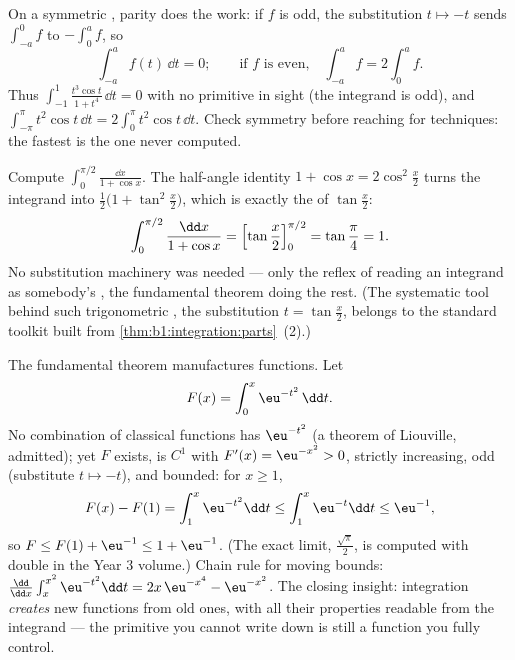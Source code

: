 \begin{example}\label{ex:b1:integration:parity}
On a symmetric , parity does the work: if $f$ is odd,
the substitution $t \mapsto -t$ sends $\int_{-a}^{0} f$ to
$-\int_0^a f$, so
\[
\int_{-a}^{a} f(t)\,\dd t = 0 ;
\qquad\text{if $f$ is even,}\quad
\int_{-a}^{a} f = 2\int_0^a f .
\]
Thus $\int_{-1}^{1} \frac{t^3\cos t}{1 + t^4}\,\dd t = 0$ with
no primitive in sight (the integrand is odd), and
$\int_{-\pi}^{\pi} t^2\cos t\,\dd t = 2\int_0^\pi t^2\cos t\,
\dd t$. Check symmetry before reaching for techniques: the
fastest  is the one never computed.
\end{example}

\begin{example}\label{ex:b1:integration:halfangle}
Compute $\displaystyle\int_0^{\pi/2} \frac{\dd x}{1 + \cos x}$.
The half-angle identity $1 + \cos x = 2\cos^2\frac x2$ turns the
integrand into $\frac{1}{2}\bigl(1 + \tan^2\frac
x2\bigr)$, which is exactly the  of $\tan\frac x2$:
\[
\int_0^{\pi/2} \frac{\dd x}{1 + \cos x}
= \Bigl[\tan\frac x2\Bigr]_0^{\pi/2} = \tan\frac\pi4 = 1 .
\]
No substitution machinery was needed --- only the reflex of
reading an integrand as somebody's , the fundamental
theorem doing the rest. (The systematic tool behind such
trigonometric , the substitution $t = \tan\frac x2$,
belongs to the standard toolkit built from
\cref{thm:b1:integration:parts}~(2).)
\end{example}

\begin{example}\label{ex:b1:integration:definedby}
The fundamental theorem manufactures functions. Let
\[
F(x) = \int_0^x \eu^{-t^2}\,\dd t .
\]
No combination of classical functions has 
$\eu^{-t^2}$ (a theorem of Liouville, admitted); yet $F$ exists,
is $C^1$ with $F'(x) = \eu^{-x^2} > 0$, strictly increasing, odd
(substitute $t \mapsto -t$), and bounded: for $x \geq 1$,
\[
F(x) - F(1) = \int_1^x \eu^{-t^2}\dd t
\leq \int_1^x \eu^{-t}\dd t \leq \eu^{-1} ,
\]
so $F \leq F(1) + \eu^{-1} \leq 1 + \eu^{-1}$. (The exact limit,
$\frac{\sqrt\pi}{2}$, is computed with double  in the
Year 3 volume.) Chain rule for moving bounds: $\frac{\dd}{\dd
x}\int_x^{x^2} \eu^{-t^2}\dd t = 2x\,\eu^{-x^4} - \eu^{-x^2}$.
The closing insight: integration \emph{creates} new functions
from old ones, with all their properties readable from the
integrand --- the primitive you cannot write down is still a
function you fully control.
\end{example}

